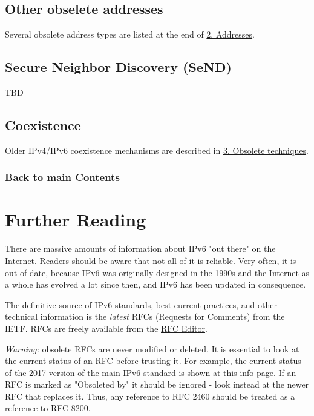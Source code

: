 \documentclass[
]{article}
\begin{document}
\subsection{Other obselete addresses}\label{other-obselete-addresses}

Several obsolete address types are listed at the end of
\hyperref[addresses]{2. Addresses}.

\subsection{Secure Neighbor Discovery
(SeND)}\label{secure-neighbor-discovery-send}

TBD

\subsection{Coexistence}\label{coexistence}

Older IPv4/IPv6 coexistence mechanisms are described in
\hyperref[obsolete-techniques]{3. Obsolete techniques}.

\subsubsection{\texorpdfstring{\hyperref[list-of-contents]{Back to main
Contents}}{Back to main Contents}}\label{back-to-main-contents-9}

\pagebreak

\section{Further Reading}\label{further-reading}

There are massive amounts of information about IPv6 "out there" on the
Internet. Readers should be aware that not all of it is reliable. Very
often, it is out of date, because IPv6 was originally designed in the
1990s and the Internet as a whole has evolved a lot since then, and IPv6
has been updated in consequence.

The definitive source of IPv6 standards, best current practices, and
other technical information is the \emph{latest} RFCs (Requests for
Comments) from the IETF. RFCs are freely available from the
\href{https://www.rfc-editor.org/}{RFC Editor}.

\emph{Warning:} obsolete RFCs are never modified or deleted. It is
essential to look at the current status of an RFC before trusting it.
For example, the current status of the 2017 version of the main IPv6
standard is shown at \href{https://www.rfc-editor.org/info/rfc8200}{this
info page}. If an RFC is marked as "Obsoleted by" it should be ignored -
look instead at the newer RFC that replaces it. Thus, any reference to
RFC 2460 should be treated as a reference to RFC 8200.
\end{document}
